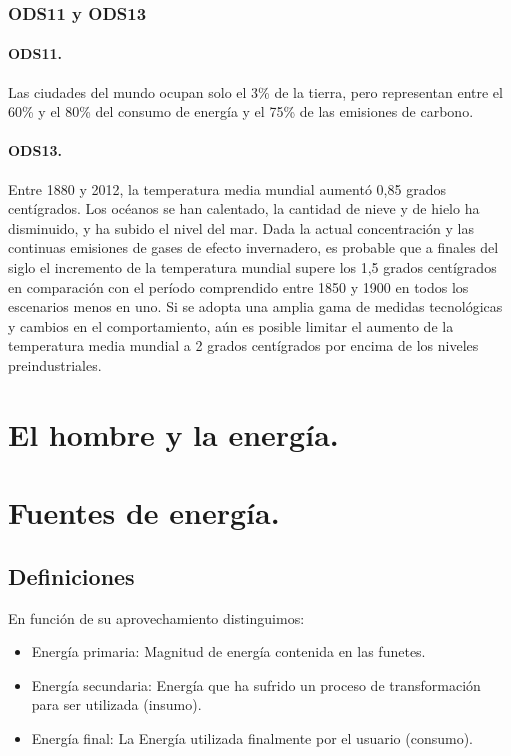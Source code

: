 \subsubsection{ODS11 y ODS13}

\paragraph{ODS11.}
Las ciudades del mundo ocupan solo el 3\% de la tierra, pero representan entre el 60\% y el 80\% del consumo de energía y el 75\% de las emisiones de carbono.

\paragraph{ODS13.}
Entre 1880 y 2012, la temperatura media mundial aumentó 0,85 grados centígrados. Los océanos se han calentado, la cantidad de nieve y de hielo ha disminuido, y ha subido el nivel del mar. Dada la actual concentración y las continuas emisiones de gases de efecto invernadero, es probable que a finales del siglo el incremento de la temperatura mundial supere los 1,5 grados centígrados en comparación con el período comprendido entre 1850 y 1900 en todos los escenarios menos en uno. Si se adopta una amplia gama de medidas tecnológicas y cambios en el comportamiento, aún es posible limitar el aumento de la temperatura media mundial a 2 grados centígrados por encima de los niveles preindustriales.

\section{El hombre y la energía.}

\section{Fuentes de energía.}
\subsection{Definiciones}
En función de su aprovechamiento distinguimos:
\begin{itemize}
    \item Energía primaria: Magnitud de energía contenida en las funetes.
    \item Energía secundaria: Energía que ha sufrido un proceso de transformación para ser utilizada (insumo).
    \item Energía final: La Energía utilizada finalmente por el usuario (consumo).
\end{itemize}

